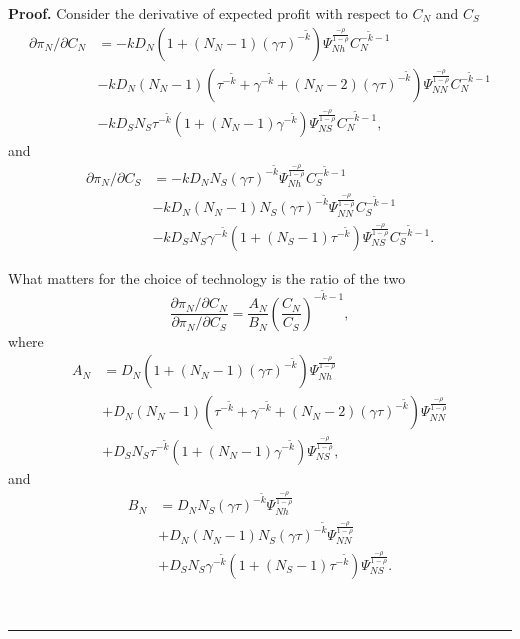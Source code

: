 \documentclass[notitlepage,11pt]{article}%
\newenvironment{proof}[1][Proof]{\noindent \textbf{#1.} }{\  \rule{0.5em}{0.5em}}
\begin{document}
\begin{proof}
Consider the derivative of expected profit with respect to $C_{N}$ and $C_{S}$%
\begin{align*}
\partial\pi_{N}/\partial C_{N}  &  =-kD_{N}\left(  1+\left(  N_{N}-1\right)
\left(  \gamma\tau\right)  ^{-\tilde{k}}\right)  \Psi_{Nh}^{\frac{-\rho
}{1-\rho}}C_{N}^{-\tilde{k}-1}\\
&  -kD_{N}\left(  N_{N}-1\right)  \left(  \tau^{-\tilde{k}}+\gamma^{-\tilde
{k}}+\left(  N_{N}-2\right)  \left(  \gamma\tau\right)  ^{-\tilde{k}}\right)
\Psi_{NN}^{\frac{-\rho}{1-\rho}}C_{N}^{-\tilde{k}-1}\\
&  -kD_{S}N_{S}\tau^{-\tilde{k}}\left(  1+\left(  N_{N}-1\right)
\gamma^{-\tilde{k}}\right)  \Psi_{NS}^{\frac{-\rho}{1-\rho}}C_{N}^{-\tilde
{k}-1},
\end{align*}
and%
\begin{align*}
\partial\pi_{N}/\partial C_{S}  &  =-kD_{N}N_{S}\left(  \gamma\tau\right)
^{-\tilde{k}}\Psi_{Nh}^{\frac{-\rho}{1-\rho}}C_{S}^{-\tilde{k}-1}\\
&  -kD_{N}\left(  N_{N}-1\right)  N_{S}\left(  \gamma\tau\right)  ^{-\tilde
{k}}\Psi_{NN}^{\frac{-\rho}{1-\rho}}C_{S}^{-\tilde{k}-1}\\
&  -kD_{S}N_{S}\gamma^{-\tilde{k}}\left(  1+\left(  N_{S}-1\right)
\tau^{-\tilde{k}}\right)  \Psi_{NS}^{\frac{-\rho}{1-\rho}}C_{S}^{-\tilde{k}%
-1}.
\end{align*}


What matters for the choice of technology is the ratio of the two%
\[
\frac{\partial\pi_{N}/\partial C_{N}}{\partial\pi_{N}/\partial C_{S}}%
=\frac{A_{N}}{B_{N}}\left(  \frac{C_{N}}{C_{S}}\right)  ^{-\tilde{k}-1},
\]
where%
\begin{align*}
A_{N}  &  =D_{N}\left(  1+\left(  N_{N}-1\right)  \left(  \gamma\tau\right)
^{-\tilde{k}}\right)  \Psi_{Nh}^{\frac{-\rho}{1-\rho}}\\
&  +D_{N}\left(  N_{N}-1\right)  \left(  \tau^{-\tilde{k}}+\gamma^{-\tilde{k}%
}+\left(  N_{N}-2\right)  \left(  \gamma\tau\right)  ^{-\tilde{k}}\right)
\Psi_{NN}^{\frac{-\rho}{1-\rho}}\\
&  +D_{S}N_{S}\tau^{-\tilde{k}}\left(  1+\left(  N_{N}-1\right)
\gamma^{-\tilde{k}}\right)  \Psi_{NS}^{\frac{-\rho}{1-\rho}},
\end{align*}
and%
\begin{align*}
B_{N}  &  =D_{N}N_{S}\left(  \gamma\tau\right)  ^{-\tilde{k}}\Psi_{Nh}%
^{\frac{-\rho}{1-\rho}}\\
&  +D_{N}\left(  N_{N}-1\right)  N_{S}\left(  \gamma\tau\right)  ^{-\tilde{k}%
}\Psi_{NN}^{\frac{-\rho}{1-\rho}}\\
&  +D_{S}N_{S}\gamma^{-\tilde{k}}\left(  1+\left(  N_{S}-1\right)
\tau^{-\tilde{k}}\right)  \Psi_{NS}^{\frac{-\rho}{1-\rho}}.
\end{align*}



\end{proof}
\end{document}

